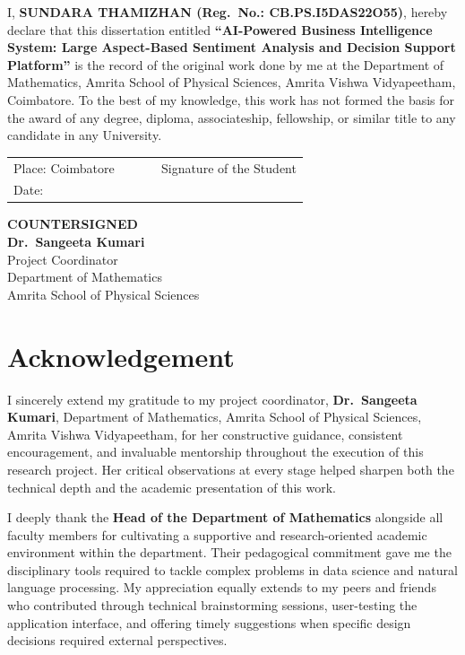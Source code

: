 \documentclass[12pt,a4paper]{report}
\begin{document}
\noindent I, \textbf{SUNDARA THAMIZHAN (Reg.\ No.: CB.PS.I5DAS22O55)},
hereby declare that this dissertation entitled
\textbf{``AI-Powered Business Intelligence System: Large Aspect-Based Sentiment
Analysis and Decision Support Platform''} is the record of the original work
done by me at the Department of Mathematics, Amrita School of Physical Sciences,
Amrita Vishwa Vidyapeetham, Coimbatore. To the best of my knowledge, this work
has not formed the basis for the award of any degree, diploma, associateship,
fellowship, or similar title to any candidate in any University.

\vspace{2cm}
\noindent
\begin{tabular}{@{}p{0.5\linewidth} p{0.5\linewidth}@{}}
Place: Coimbatore & \hfill Signature of the Student \\[0.8cm]
Date: \phantom{Coimbatorexx} & \\
\end{tabular}

\vspace{3cm}
\begin{center}
\textbf{COUNTERSIGNED}\\[0.8cm]
\textbf{Dr.\ Sangeeta Kumari}\\
Project Coordinator\\
Department of Mathematics\\
Amrita School of Physical Sciences
\end{center}

\newpage
\chapter*{Acknowledgement}

I sincerely extend my gratitude to my project coordinator, \textbf{Dr.\ Sangeeta Kumari}, Department of Mathematics, Amrita School of Physical Sciences, Amrita Vishwa Vidyapeetham, for her constructive guidance, consistent encouragement, and invaluable mentorship throughout the execution of this research project. Her critical observations at every stage helped sharpen both the technical depth and the academic presentation of this work.

I deeply thank the \textbf{Head of the Department of Mathematics} alongside all faculty members for cultivating a supportive and research-oriented academic environment within the department. Their pedagogical commitment gave me the disciplinary tools required to tackle complex problems in data science and natural language processing. My appreciation equally extends to my peers and friends who contributed through technical brainstorming sessions, user-testing the application interface, and offering timely suggestions when specific design decisions required external perspectives.
\end{document}
